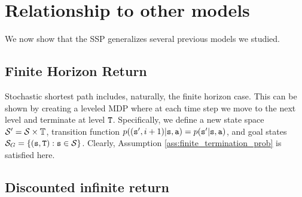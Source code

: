 



\section{Relationship to other models}

We now show that the SSP generalizes several previous models we studied.

\subsection{Finite Horizon Return}
Stochastic shortest path includes, naturally, the finite horizon case. 
This can be shown by creating a leveled MDP where at each time step we move to the next level and terminate at level ${\tt T}$.
Specifically, we define a new state space $\mathcal{S}'=\mathcal{S}\times \mathbb{T}$, transition function $p(({\tt s}',i+1)|{\tt s},{\tt a})=p({\tt s}'|{\tt s},{\tt a})$, and goal states $\mathcal{S}_G=\{({\tt s},{\tt T}):{\tt s} \in\mathcal{S}\}$.
Clearly, Assumption \ref{ass:finite_termination_prob} is satisfied here.

\subsection{Discounted infinite return}

